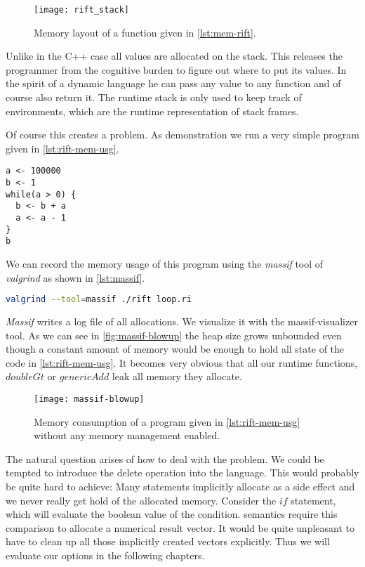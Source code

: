\begin{figure}[h]
\centering
\texttt{[image: rift\_stack]}
\caption{Memory layout of a \rift function given in \autoref{lst:mem-rift}.}
\label{fig:rift_stack}
\end{figure}

Unlike in the C++ case all \rift values are allocated on the stack. This releases the programmer from the cognitive burden to figure out where to put its values. In the spirit of a dynamic language he can pass any value to any function and of course also return it. The runtime stack is only used to keep track of environments, which are the runtime representation of \rift stack frames.

Of course this creates a problem. As demonstration we run a very simple \rift program given in \autoref{lst:rift-mem-usg}. 

\begin{lstlisting}[language=rift, caption={loop.ri}, label={lst:rift-mem-usg}]
a <- 100000
b <- 1
while(a > 0) {
  b <- b + a
  a <- a - 1
}
b
\end{lstlisting}

We can record the memory usage of this program using the \emph{massif} tool of \emph{valgrind} as shown in \autoref{lst:massif}.

\begin{lstlisting}[language=bash, label={lst:massif}]
valgrind --tool=massif ./rift loop.ri
\end{lstlisting}

\emph{Massif} writes a log file of all allocations. We visualize it with the massif-visualizer tool. As we can see in \autoref{fig:massif-blowup} the heap size grows unbounded even though a constant amount of memory would be enough to hold all state of the code in \autoref{lst:rift-mem-usg}. It becomes very obvious that all our runtime functions, \eg $doubleGt$ or $genericAdd$ leak all memory they allocate.

\begin{figure}[h]
\centering
\texttt{[image: massif-blowup]}
\caption{Memory consumption of a \rift program given in \autoref{lst:rift-mem-usg} without any memory management enabled.}
\label{fig:massif-blowup}
\end{figure}

The natural question arises of how to deal with the problem. We could be tempted to introduce the delete operation into the \rift language. This would probably be quite hard to achieve: Many \rift statements implicitly allocate as a side effect and we never really get hold of the allocated memory. Consider \eg the $if$ statement, which will evaluate the boolean value of the condition. \Rift semantics require this comparison to allocate a numerical result vector. It would be quite unpleasant to have to clean up all those implicitly created vectors explicitly. Thus we will evaluate our options in the following chapters.

